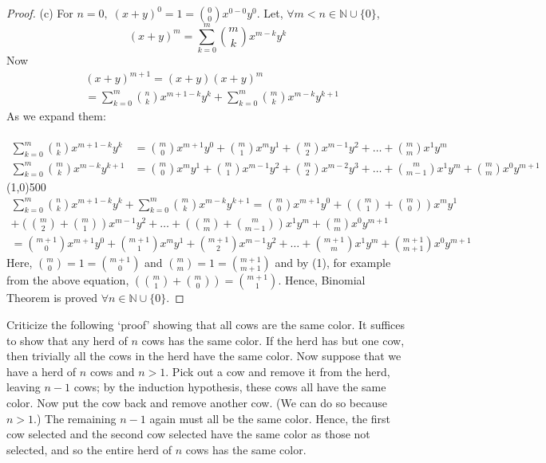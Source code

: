 \documentclass[12pt]{article}
\newenvironment{problem}[2][Problem]{\begin{trivlist}
\item[\hskip \labelsep {\bfseries #1}\hskip \labelsep {\bfseries #2.}]}{\end{trivlist}}
\begin{document}
\begin{proof}
(c) For $n = 0, \; (x + y)^0 = 1 = \binom{0}{0}x^{0-0}y^0$. Let, $\forall m < n \in {\mathbb{N}} \cup \{0\}$,
\[
(x + y)^m = \sum_{k=0}^{m} \binom{m}{k} x^{m-k} y^k
\]
Now
\begin{align*}
& (x + y)^{m+1} = (x+y)(x+y)^m \\
& = \sum_{k=0}^m \binom{n}{k}x^{m+1-k}y^{k} + \sum_{k=0}^m \binom{m}{k} x^{m-k}y^{k+1}
\end{align*}
As we expand them: \\\\
\begin{align*}
\sum_{k=0}^m \binom{n}{k}x^{m+1-k}y^{k}
& = \binom{m}{0} x^{m+1} y^0 + \binom{m}{1} x^m y^1 + \binom{m}{2} x^{m-1} y^2 + \dots + \binom{m}{m} x^1 y^m \\
\sum_{k=0}^m \binom{m}{k} x^{m-k}y^{k+1}
& = \binom{m}{0} x^m y^1 + \binom{m}{1} x^{m-1} y^2 + \binom{m}{2} x^{m-2} y^3 + \dots + \binom{m}{m-1} x^1 y^m + \binom{m}{m} x^0 y^{m+1}
\end{align*}
\line(1,0){500}
\begin{multline*}
\sum_{k=0}^m \binom{n}{k}x^{m+1-k}y^{k} + \sum_{k=0}^m \binom{m}{k} x^{m-k}y^{k+1}  = \binom{m}{0}x^{m+1}y^0 + \left(\binom{m}{1} + \binom{m}{0}\right)x^m y^1 \\ + \left(\binom{m}{2} + \binom{m}{1}\right) x^{m-1}y^2 + \dots + \left(\binom{m}{m} + \binom{m}{m-1}\right) x^1 y^m + \binom{m}{m} x^0 y^{m+1} \\
 = \binom{m+1}{0} x^{m+1} y^0 + \binom{m+1}{1} x^m y^1 + \binom{m+1}{2} x^{m-1} y^2 + \dots + \binom{m+1}{m} x^1 y^m + \binom{m+1}{m+1} x^0 y^{m+1}
\end{multline*}
Here, $\binom{m}{0} = 1 = \binom{m+1}{0}$ and $\binom{m}{m} = 1 = \binom{m+1}{m+1}$ and by (1), for example from the above equation, $\left(\binom{m}{1} + \binom{m}{0}\right) = \binom{m+1}{1}$. Hence, Binomial Theorem is proved $\forall n \in {\mathbb{N}}\cup \{0\}$.

\end{proof}

\begin{problem}{15}
Criticize the following `proof' showing that all cows are the same color. It suffices to show that any herd of \( n \) cows has the same color. If the herd has but one cow, then trivially all the cows in the herd have the same color. Now suppose that we have a herd of \( n \) cows and \( n > 1 \). Pick out a cow and remove it from the herd, leaving \( n - 1 \) cows; by the induction hypothesis, these cows all have the same color. Now put the cow back and remove another cow. (We can do so because \( n > 1 \).) The remaining \( n - 1 \) again must all be the same color. Hence, the first cow selected and the second cow selected have the same color as those not selected, and so the entire herd of \( n \) cows has the same color.

\end{problem}
\end{document}
